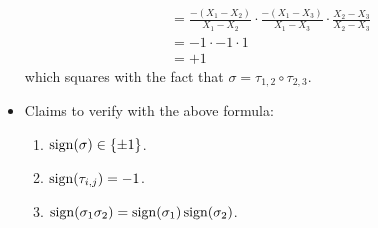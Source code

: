 \documentclass[../notes.tex]{subfiles}
\begin{document}
\begin{itemize}
\begin{align*}
        &= \frac{-(X_1-X_2)}{X_1-X_2}\cdot\frac{-(X_1-X_3)}{X_1-X_3}\cdot\frac{X_2-X_3}{X_2-X_3}\\
        &= -1\cdot -1\cdot 1\\
        &= +1
    \end{align*}
    which squares with the fact that $\sigma=\tau_{1,2}\circ\tau_{2,3}$.
    \item Claims to verify with the above formula:
    \begin{enumerate}
        \item $\operatorname{sign}(\sigma)\in\{\pm 1\}$.
        \item $\operatorname{sign}(\tau_{i,j})=-1$.
        \item $\operatorname{sign}(\sigma_1\sigma_2)=\operatorname{sign}(\sigma_1)\operatorname{sign}(\sigma_2)$.
    \end{enumerate}
\end{itemize}
\end{document}
